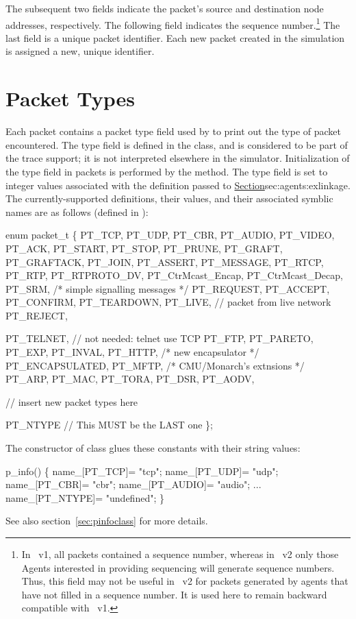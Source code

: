 The subsequent two fields indicate the packet's source and destination
node addresses, respectively.
The following field indicates the sequence number.\footnote{In \ns~v1,
all packets contained a sequence number, whereas in \ns~v2 only those
Agents interested in providing sequencing will generate sequence numbers.
Thus, this field may not be useful in \ns~v2 for packets generated by
agents that have not filled in a sequence number.  It is used here
to remain backward compatible with \ns~v1.}
The last field is a unique packet identifier.  Each new packet
created in the simulation is assigned a new, unique identifier.

\section{Packet Types}
\label{sec:traceptype}

Each packet contains a packet type field used by 
to print out the type of packet encountered.
The type field is defined in the  class, and is considered
to be part of the trace support; it is not interpreted
elsewhere in the simulator.
Initialization of the type field in packets is performed by the
 method.
The type field is set to integer values associated with the
definition passed to
\href{the \code{Agent} constructor}{Section}{sec:agents:exlinkage}.
The currently-supported definitions, their values, and their
associated symblic names are as follows
(defined in ):
\begin{program}
enum packet_t \{
	PT_TCP,
	PT_UDP,
	PT_CBR,
	PT_AUDIO,
	PT_VIDEO,
	PT_ACK,
	PT_START,
	PT_STOP,
	PT_PRUNE,
	PT_GRAFT,
	PT_GRAFTACK,
	PT_JOIN,
	PT_ASSERT,
	PT_MESSAGE,
	PT_RTCP,
	PT_RTP,
	PT_RTPROTO_DV,
	PT_CtrMcast_Encap,
	PT_CtrMcast_Decap,
	PT_SRM,
	/* simple signalling messages */
	PT_REQUEST,	
	PT_ACCEPT,	
	PT_CONFIRM,	
	PT_TEARDOWN,	
	PT_LIVE,	// packet from live network
	PT_REJECT,

	PT_TELNET,	// not needed: telnet use TCP
	PT_FTP,
	PT_PARETO,
	PT_EXP,
	PT_INVAL,
	PT_HTTP,
	/* new encapsulator */
	PT_ENCAPSULATED,
	PT_MFTP,
	/* CMU/Monarch's extnsions */
	PT_ARP,
	PT_MAC,
	PT_TORA,
	PT_DSR,
	PT_AODV,

	// insert new packet types here

	PT_NTYPE // This MUST be the LAST one
\};
\end{program}
The constructor of class  glues these constants with
their string values:
\begin{program}
	p_info() \{
		name_[PT_TCP]= "tcp";
		name_[PT_UDP]= "udp";
		name_[PT_CBR]= "cbr";
		name_[PT_AUDIO]= "audio";
		...
		name_[PT_NTYPE]= "undefined";
	\}
\end{program}
See also section~\ref{sec:pinfoclass} for more details.

